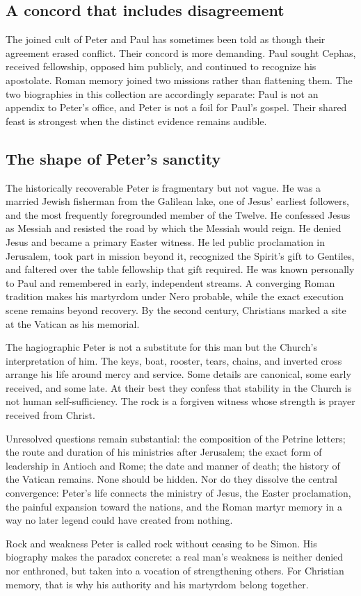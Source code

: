\subsection{A concord that includes disagreement}

The joined cult of Peter and Paul has sometimes been told as though their
agreement erased conflict. Their concord is more demanding. Paul sought
Cephas, received fellowship, opposed him publicly, and continued to recognize
his apostolate. Roman memory joined two missions rather than flattening them.
The two biographies in this collection are accordingly separate: Paul is not
an appendix to Peter's office, and Peter is not a foil for Paul's gospel. Their
shared feast is strongest when the distinct evidence remains audible.

\subsection{The shape of Peter's sanctity}

The historically recoverable Peter is fragmentary but not vague. He was a
married Jewish fisherman from the Galilean lake, one of Jesus' earliest
followers, and the most frequently foregrounded member of the Twelve. He
confessed Jesus as Messiah and resisted the road by which the Messiah would
reign. He denied Jesus and became a primary Easter witness. He led public
proclamation in Jerusalem, took part in mission beyond it, recognized the
Spirit's gift to Gentiles, and faltered over the table fellowship that gift
required. He was known personally to Paul and remembered in early, independent
streams. A converging Roman tradition makes his martyrdom under Nero probable,
while the exact execution scene remains beyond recovery. By the second
century, Christians marked a site at the Vatican as his memorial.

The hagiographic Peter is not a substitute for this man but the Church's
interpretation of him. The keys, boat, rooster, tears, chains, and inverted
cross arrange his life around mercy and service. Some details are canonical,
some early received, and some late. At their best they confess that stability
in the Church is not human self-sufficiency. The rock is a forgiven witness
whose strength is prayer received from Christ.

Unresolved questions remain substantial: the composition of the Petrine
letters; the route and duration of his ministries after Jerusalem; the exact
form of leadership in Antioch and Rome; the date and manner of death; the
history of the Vatican remains. None should be hidden. Nor do they dissolve
the central convergence: Peter's life connects the ministry of Jesus, the
Easter proclamation, the painful expansion toward the nations, and the Roman
martyr memory in a way no later legend could have created from nothing.

\begin{studybox}{Rock and weakness}
Peter is called rock without ceasing to be Simon. His biography makes the
paradox concrete: a real man's weakness is neither denied nor enthroned, but
taken into a vocation of strengthening others. For Christian memory, that is
why his authority and his martyrdom belong together.
\end{studybox}
